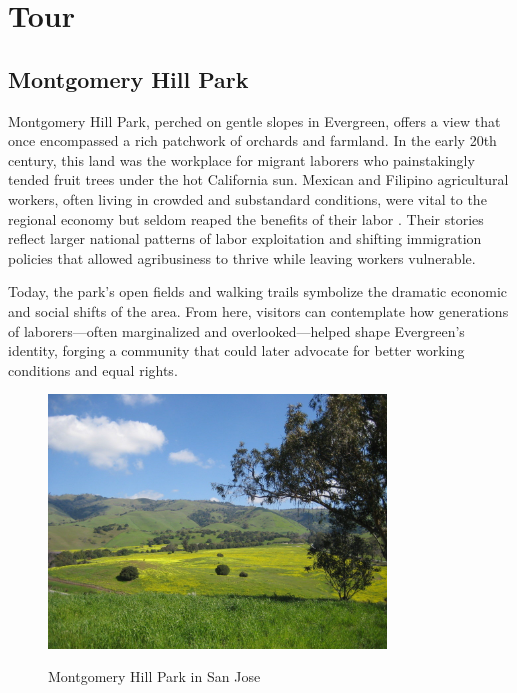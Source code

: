 \documentclass[12pt]{article}
\begin{document}
\section{Tour}

\subsection{Montgomery Hill Park}

Montgomery Hill Park, perched on gentle slopes in Evergreen, offers a view that once encompassed a rich patchwork of orchards and farmland. In the early 20th century, this land was the workplace for migrant laborers who painstakingly tended fruit trees under the hot California sun. Mexican and Filipino agricultural workers, often living in crowded and substandard conditions, were vital to the regional economy but seldom reaped the benefits of their labor \cite{pitti2018the}. Their stories reflect larger national patterns of labor exploitation and shifting immigration policies that allowed agribusiness to thrive while leaving workers vulnerable.

Today, the park’s open fields and walking trails symbolize the dramatic economic and social shifts of the area. From here, visitors can contemplate how generations of laborers—often marginalized and overlooked—helped shape Evergreen’s identity, forging a community that could later advocate for better working conditions and equal rights.

\begin{figure}[h]
  \centering
  \includegraphics[width=0.8\textwidth]{assets/montgomery_hill.png}
  \caption{Montgomery Hill Park in San Jose}
  \label{fig:montgomery_hill}
  \cite{a2017montgomery}
\end{figure}
\end{document}
